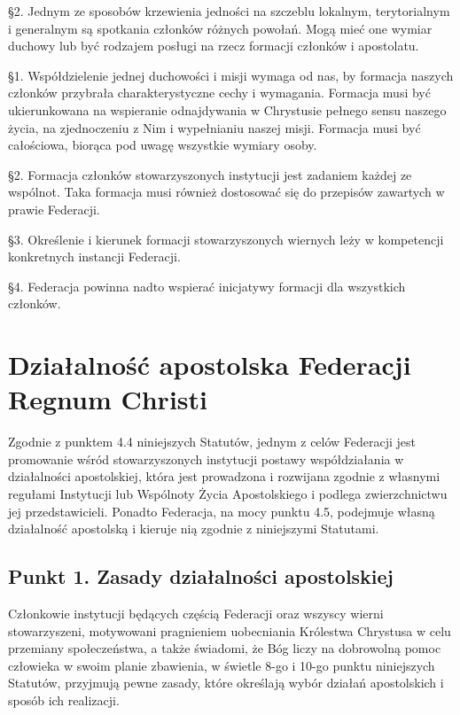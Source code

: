 \S{}2. Jednym ze sposobów krzewienia jedności na szczeblu lokalnym, terytorialnym i generalnym są spotkania członków różnych powołań. Mogą mieć one wymiar duchowy lub być rodzajem posługi na rzecz formacji członków i apostolatu.
 
 
 \S{}1. Współdzielenie jednej duchowości i misji wymaga od nas, by formacja naszych członków przybrała charakterystyczne cechy i wymagania. Formacja musi być ukierunkowana na wspieranie odnajdywania w Chrystusie pełnego sensu naszego życia, na zjednoczeniu z Nim i wypełnianiu naszej misji. Formacja musi być całościowa,  biorąca pod uwagę wszystkie wymiary osoby.


\S{}2. Formacja członków stowarzyszonych instytucji jest zadaniem każdej ze wspólnot. Taka formacja musi również dostosować się do przepisów zawartych w prawie Federacji.


\S{}3. Określenie i kierunek formacji stowarzyszonych wiernych leży w kompetencji konkretnych instancji Federacji.


\S{}4. Federacja powinna nadto wspierać inicjatywy formacji dla wszystkich członków.


\chapter{Działalność apostolska Federacji Regnum Christi}


 Zgodnie z punktem 4.4 niniejszych Statutów, jednym z celów Federacji jest promowanie wśród stowarzyszonych instytucji postawy współdziałania w działalności apostolskiej, która jest prowadzona i rozwijana zgodnie z własnymi regułami Instytucji lub Wspólnoty Życia Apostolskiego i podlega zwierzchnictwu jej przedstawicieli. Ponadto Federacja, na mocy punktu 4.5, podejmuje  własną działalność  apostolską i kieruje nią zgodnie z niniejszymi Statutami.


\section{Punkt 1. Zasady działalności apostolskiej}


                        
 Członkowie instytucji będących częścią Federacji oraz wszyscy wierni stowarzyszeni, motywowani pragnieniem uobecniania Królestwa Chrystusa w celu przemiany społeczeństwa, a także świadomi, że Bóg liczy na dobrowolną pomoc człowieka w swoim planie zbawienia, w świetle 8-go i 10-go punktu niniejszych Statutów, przyjmują pewne zasady, które określają wybór działań apostolskich i sposób ich realizacji.


